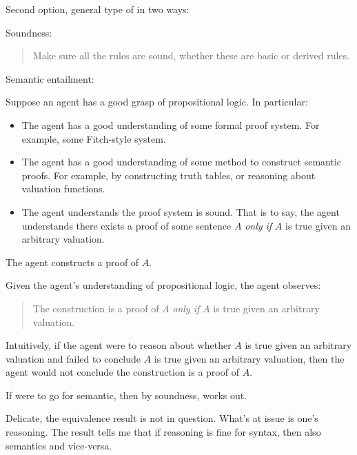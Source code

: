 \begin{note}
  Second option, general type of  in two ways:

  Soundness:

  \begin{quote}
    Make sure all the rules are sound, whether these are basic or derived rules.
  \end{quote}

  Semantic entailment:

  \begin{scenario}
    \label{illu:sketch:prop-logic}
    Suppose an agent has a good grasp of propositional logic.
    In particular:
    \begin{itemize}
    \item
      The agent has a good understanding of some formal proof system.
      For example, some Fitch-style system.
    \item
      The agent has a good understanding of some method to construct semantic proofs.
      For example, by constructing truth tables, or reasoning about valuation functions.
    \item
      The agent understands the proof system is sound.
      That is to say, the agent understands there exists a proof of some sentence \(A\) \emph{only if} \(A\) is true given an arbitrary valuation.
    \end{itemize}
    The agent constructs a proof of \(A\).

    Given the agent's understanding of propositional logic, the agent observes:
    \begin{quote}
      The construction is a proof of \(A\) \emph{only if} \(A\) is true given an arbitrary valuation.
    \end{quote}
  \end{scenario}

  Intuitively, if the agent were to reason about whether \(A\) is true given an arbitrary valuation and failed to conclude \(A\) is true given an arbitrary valuation, then the agent would not conclude the construction is a proof of \(A\).

  If were to go for semantic, then by soundness, works out.
\end{note}

\begin{note}[Interest]
  Delicate, the equivalence result is not in question.
  What's at issue is one's reasoning.
  The result tells me that if reasoning is fine for syntax, then also semantics and vice-versa.
\end{note}

